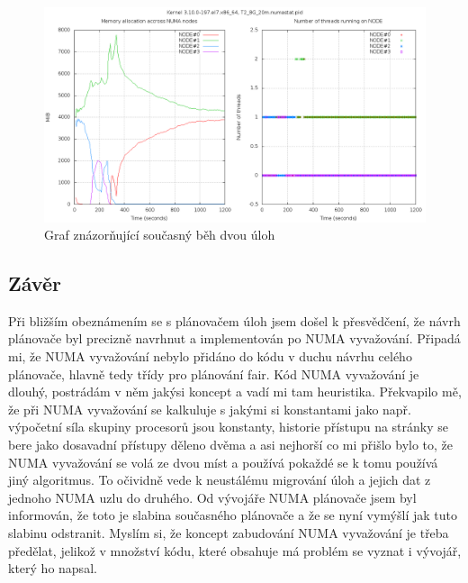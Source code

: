 \documentclass[a4paper,12pt]{article}
\begin{document}
\begin{figure}[ht]
\includegraphics[scale=0.35]{obrazky/PerfBenchResult.png}
\caption{Graf znázorňující současný běh dvou úloh}
\label{PerfBenchResult}
\end{figure}

\subsection{Závěr}
Při bližším obeznámením se s plánovačem úloh jsem došel k přesvědčení, že návrh plánovače byl precizně navrhnut a implementován po NUMA vyvažování. Připadá mi, že NUMA vyvažování nebylo přidáno do kódu v duchu návrhu celého plánovače, hlavně tedy třídy pro plánování fair. Kód NUMA vyvažování je dlouhý, postrádám v něm jakýsi koncept a vadí mi tam heuristika. Překvapilo mě, že při NUMA vyvažování se kalkuluje s jakými si konstantami jako např. výpočetní síla skupiny procesorů jsou konstanty, historie přístupu na stránky se bere jako dosavadní přístupy děleno dvěma a asi nejhorší co mi přišlo bylo to, že NUMA vyvažování se volá ze dvou míst a používá pokaždé se k tomu používá jiný algoritmus. To očividně vede k neustálému migrování úloh a jejich dat z jednoho NUMA uzlu do druhého. Od vývojáře NUMA plánovače jsem byl informován, že toto je slabina současného plánovače a že se nyní vymýšlí jak tuto slabinu odstranit. Myslím si, že koncept zabudování NUMA vyvažování je třeba předělat, jelikož v množství  kódu, které obsahuje má problém se vyznat i vývojář, který ho napsal.
\end{document}
